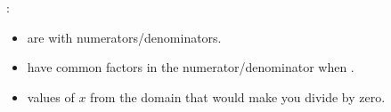  :
\begin{itemize}[]
    \item are  with  numerators/denominators.
    \item have  common factors in the numerator/denominator when .
    \item {} values of $x$ from the domain that would make you divide by zero.
\end{itemize}
